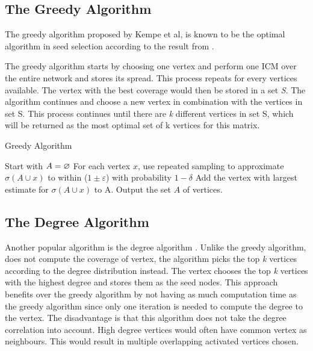 \subsection{The Greedy Algorithm}
The greedy algorithm \cite{greedyInfluenc2005} \cite{Chen:2009:EIM:1557019.1557047} proposed by Kempe et al, is known to be the optimal algorithm in seed selection according to the result from  \cite{greedyInfluenc2005}.

The greedy algorithm starts by choosing one vertex and perform one ICM over the entire network and stores its spread. This process repeats for every vertices available. The vertex with the best coverage would then be stored in a set \textit{S}. The algorithm continues and choose a new vertex in combination with the vertices in set S. This process continues until there are \textit{k} different vertices in set S, which will be returned as the most optimal set of k vertices for this matrix. 

 \begin{algorithm}
\caption{Greedy Algorithm}
\begin{algorithmic}[1]
\State Start with $A = \oldemptyset$
\State For each vertex $x$, use repeated sampling to approximate $\sigma(A \cup {x}) $ to within ($1 \pm \varepsilon$) with probability
$1 − \delta$
\State Add the vertex with largest estimate for $\sigma(A \cup {x})$ to A.
\EndWhile
\State Output the set $A$ of vertices.
\end{algorithmic}
\end{algorithm}

\subsection{The Degree Algorithm}
Another popular algorithm is the degree algorithm \cite{greedyInfluenc2005}. Unlike the greedy algorithm, does not compute the coverage of vertex, the algorithm picks the top \textit{k} vertices according to the degree distribution instead. The vertex chooses the top \textit{k} vertices with the highest degree and stores them as the seed nodes. This approach benefits over the greedy algorithm by not having as much computation time as the greedy algorithm since only one iteration is needed to compute the degree to the vertex. The disadvantage is that this algorithm does not take the degree correlation into account. High degree vertices would often have common vertex as neighbours\citep{ComplexNetwork2003}. This would result in multiple overlapping activated vertices chosen.

